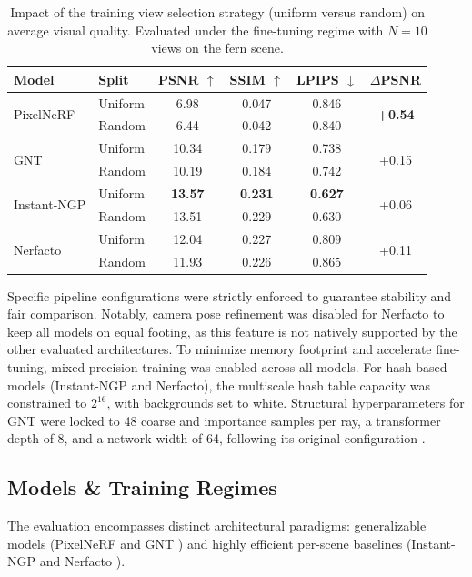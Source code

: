 \begin{table}[H]
  \centering
\caption{Impact of the training view selection strategy (uniform versus random) on average visual quality. Evaluated under the fine-tuning regime with $N=10$ views on the fern scene.}
\label{tab:split}
\scriptsize
\begin{tabular*}{\linewidth}{@{\extracolsep{\fill}}llcccc}
\toprule
Model & Split & PSNR $\uparrow$ & SSIM $\uparrow$ & LPIPS $\downarrow$ & $\Delta$PSNR \\
\midrule
\multirow{2}{*}{PixelNeRF}
  & Uniform   & 6.98   & 0.047    & 0.846    & \multirow{2}{*}{\textbf{+0.54}} \\
  & Random    & 6.44   & 0.042    & 0.840    &                        \\
\midrule
\multirow{2}{*}{GNT}
  & Uniform   & 10.34  & 0.179    & 0.738    & \multirow{2}{*}{+0.15} \\
  & Random    & 10.19  & 0.184    & 0.742    &                        \\
\midrule
\multirow{2}{*}{Instant-NGP}
  & Uniform   & \textbf{13.57} & \textbf{0.231} & \textbf{0.627} & \multirow{2}{*}{+0.06} \\
  & Random    & 13.51  & 0.229    & 0.630    &                        \\
\midrule
\multirow{2}{*}{Nerfacto}
  & Uniform   & 12.04  & 0.227    & 0.809    & \multirow{2}{*}{+0.11} \\
  & Random    & 11.93  & 0.226    & 0.865    &                        \\
\bottomrule
\end{tabular*}
\end{table}

Specific pipeline configurations were strictly enforced to guarantee stability and fair comparison. Notably, camera pose refinement was disabled for Nerfacto to keep all models on equal footing, as this feature is not natively supported by the other evaluated architectures. To minimize memory footprint and accelerate fine-tuning, mixed-precision training was enabled across all models. For hash-based models (Instant-NGP and Nerfacto), the multiscale hash table capacity was constrained to $2^{16}$, with backgrounds set to white. Structural hyperparameters for GNT were locked to 48 coarse and importance samples per ray, a transformer depth of 8, and a network width of 64, following its original configuration \cite{t2023attentionnerfneeds}.

\subsection{Models \& Training Regimes}
The evaluation encompasses distinct architectural paradigms: generalizable models (PixelNeRF \cite{yu2021pixelnerfneuralradiancefields} and GNT \cite{t2023attentionnerfneeds}) and highly efficient per-scene baselines (Instant-NGP \cite{muller2022} and Nerfacto \cite{Tancik2023}).


